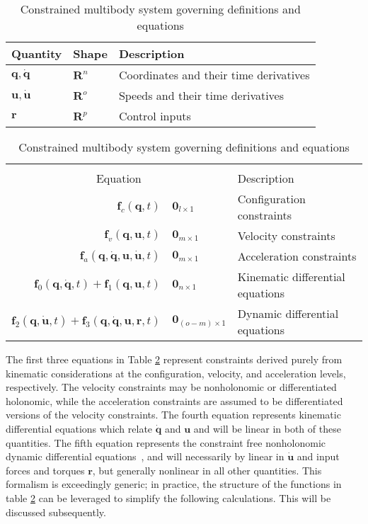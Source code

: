 \documentclass{svjour3}                     %
\begin{document}
\begin{table}[htbp]
  \centering
  \caption{Constrained multibody system governing definitions and equations}
  \label{table:assumptions}
  \begin{tabular}[c]{l l l}
    Quantity & Shape & Description\\
    \hline
    $\bm{q},\bm{\dot{q}}$ & $\mathbf{R}^n$ & Coordinates and their time
    derivatives\\
    $\bm{u}, \bm{\dot{u}}$ & $\mathbf{R}^o$ & Speeds and their time derivatives\\
    $\bm{r}$ & $\mathbf{R}^p$ & Control inputs \\
  \end{tabular}
  \begin{tabular}[c]{r @{ $=$ } l l}
    \multicolumn{3}{c}{ } \\
    \multicolumn{2}{c}{Equation} & Description \\
    \hline
    $\bm{f}_{c}(\bm{q}, t)$ & $\bm{0}_{l \times 1}$ & Configuration constraints \\
    $\bm{f}_{v}(\bm{q}, \bm{u}, t)$ & $\bm{0}_{m \times 1}$ & Velocity constraints \\
    $\bm{f}_{a}(\bm{q}, \bm{\dot{q}}, \bm{u}, \bm{\dot{u}}, t)$ & $\bm{0}_{m
    \times 1}$ & Acceleration constraints \\
    $\bm{f}_{0}(\bm{q}, \bm{\dot{q}}, t) + \bm{f}_{1}(\bm{q}, \bm{u}, t)$ &
    $\bm{0}_{n \times 1}$ & Kinematic differential equations \\
    $\bm{f}_{2}(\bm{q}, \bm{\dot{u}}, t) + \bm{f}_{3}(\bm{q}, \bm{\dot{q}},
    \bm{u}, \bm{r}, t)$ & $\bm{0}_{(o - m) \times 1}$ & Dynamic differential equations
  \end{tabular}
\end{table}
The first three equations in Table \ref{table:assumptions} represent
constraints derived purely from kinematic considerations at the configuration,
velocity, and acceleration levels, respectively.  The velocity constraints may
be nonholonomic or differentiated holonomic, while the acceleration constraints
are assumed to be differentiated versions of the velocity constraints.  The
fourth equation represents kinematic differential equations which relate
$\bm{\dot{q}}$ and $\bm{u}$ and will be linear in both of these quantities.
The fifth equation represents the constraint free nonholonomic dynamic
differential equations~\cite{Kane1985}, and will necessarily by linear in
$\bm{\dot{u}}$ and input forces and torques $\bm{r}$, but generally nonlinear
in all other quantities.  This formalism is exceedingly generic; in practice,
the structure of the functions in table \ref{table:assumptions} can be
leveraged to simplify the following calculations.  This will be discussed
subsequently.
\end{document}
